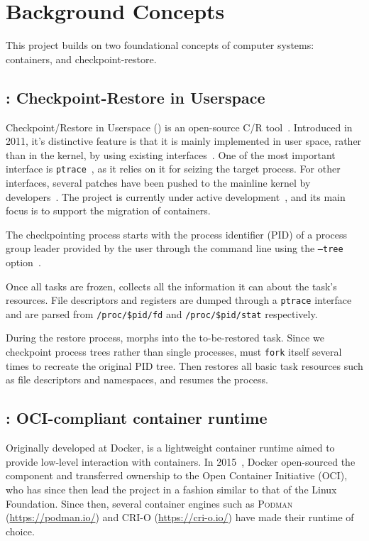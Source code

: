 \section{Background Concepts} \label{sec:background}

This project builds on two foundational concepts of computer systems: containers, and checkpoint-restore.

\subsection{\criu: Checkpoint-Restore in Userspace}

Checkpoint/Restore in Userspace (\criu) is an open-source C/R tool~\cite{criu-main-page}.
Introduced in 2011, it's distinctive feature is that it is mainly implemented in user space, rather than in the kernel, by using existing interfaces~\cite{Reber2016}.
One of the most important interface is \texttt{ptrace}~\cite{ptrace-manpage}, as it relies on it for seizing the target process.
For other interfaces, several patches have been pushed to the mainline kernel by \criu developers~\cite{criu-kernel-patches}.
The project is currently under active development~\cite{criu-github}, and its main focus is to support the migration of containers.

The checkpointing process starts with the process identifier (PID) of a process group leader provided by the user through the command line using the \texttt{--tree} option~\cite{criu-checkpoint}.

Once all tasks are frozen, \criu collects all the information it can about the task's resources.
File descriptors and registers are dumped through a \texttt{ptrace} interface and are parsed from \texttt{/proc/\$pid/fd} and \texttt{/proc/\$pid/stat} respectively.

During the restore process, \criu morphs into the to-be-restored task.
Since we checkpoint process trees rather than single processes, \criu must \texttt{fork} itself several times to recreate the original PID tree.
Then \criu restores all basic task resources such as file descriptors and namespaces, and resumes the process.

\subsection{\runc: OCI-compliant container runtime}

Originally developed at Docker, \runc is a lightweight container runtime aimed to provide low-level interaction with containers.
In 2015~\cite{introducing-runc}, Docker open-sourced the component and transferred ownership to the Open Container Initiative (OCI), who has since then lead the project in a fashion similar to that of the Linux Foundation.
Since then, several container engines such as \textsc{Podman} (\url{https://podman.io/}) and \textsc{CRI-O} (\url{https://cri-o.io/}) have made \runc their runtime of choice.

